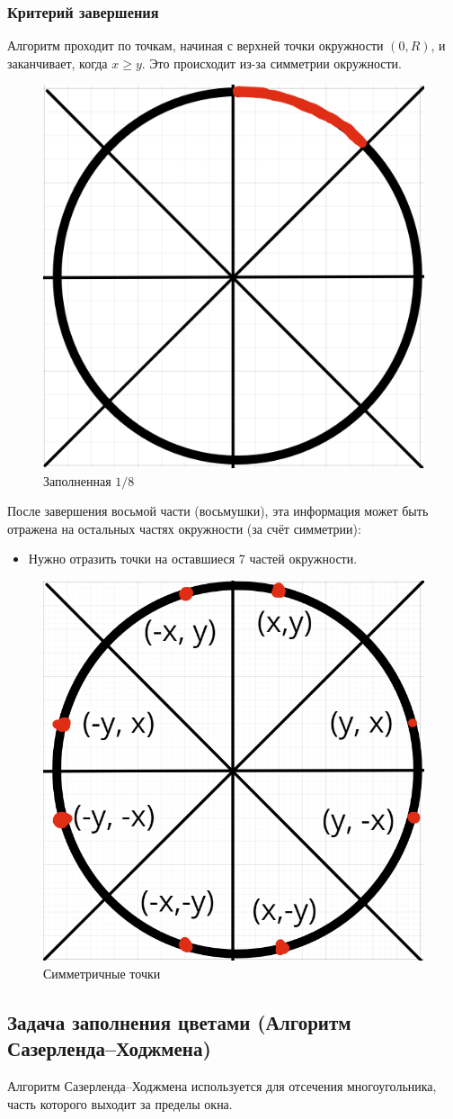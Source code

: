 \subsubsection*{Критерий завершения} Алгоритм проходит по точкам, начиная с верхней точки окружности $(0, R)$, и заканчивает, когда $x\geq y$. Это происходит из-за симметрии окружности.
\begin{figure}[H]
    \centering
    \includegraphics[width=0.5\linewidth]{circle0.25.png}
    \caption{Заполненная $1/8$}
    \label{fig:circle_0.25}
\end{figure}

После завершения восьмой части (восьмушки), эта информация может быть отражена на остальных частях окружности (за счёт симметрии):
\begin{itemize}
    \item Нужно отразить точки на оставшиеся 7 частей окружности.
\end{itemize}

\begin{figure}[H]
    \centering
    \includegraphics[width=0.5\linewidth]{circle.png}
    \caption{Симметричные точки}
    \label{fig:circle}
\end{figure}

\subsection{Задача заполнения цветами (Алгоритм Сазерленда–Ходжмена)}
Алгоритм Сазерленда–Ходжмена используется для отсечения многоугольника, часть которого выходит за пределы окна.


